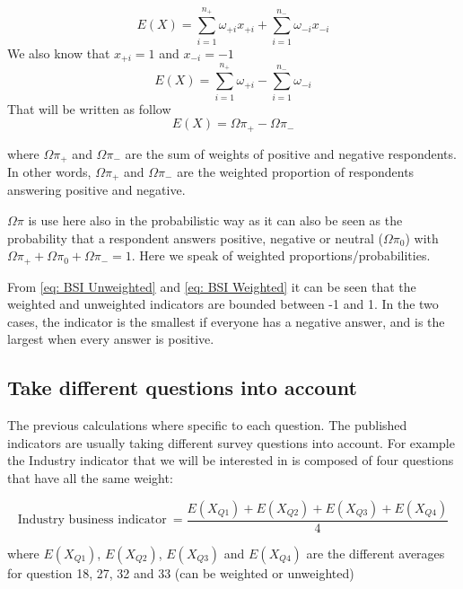\documentclass[12pt,a4paper,oneside]{book}
\begin{document}
\begin{equation}
    E(X) = \sum_{i=1}^{n_+} \omega_{+i} x_{+i} + \sum_{i=1}^{n_-} \omega_{-i} x_{-i}
\end{equation} 
We also know that $x_{+i} = 1$  and $x_{-i}=-1$  
\begin{equation}
    E(X) = \sum_{i=1}^{n_+} \omega_{+i}  - \sum_{i=1}^{n_-} \omega_{-i}
\end{equation}
That will be written as follow
\begin{equation}
    E(X) = \Omega \pi_+ - \Omega \pi_- \label{eq: BSI Weighted}
\end{equation}

where $\Omega \pi_+$ and $\Omega \pi_-$ are the sum of weights of positive and negative respondents. 
In other words, $\Omega \pi_+$ and $\Omega \pi_-$ are the weighted proportion of respondents answering positive and negative. 

$\Omega \pi$ is use here also in the probabilistic way as it can also be seen as the probability that a respondent answers positive, negative or neutral ($\Omega \pi_0$) with $\Omega \pi_+ + \Omega \pi_0 + \Omega \pi_- =1$. Here we speak of weighted proportions/probabilities.

From \autoref{eq: BSI Unweighted} and \autoref{eq: BSI Weighted} it can be seen that the weighted and unweighted indicators are bounded between -1 and 1. In the two cases, the indicator is the smallest if everyone has a negative answer, and is the largest when every answer is positive.

\subsection{Take different questions into account}

The previous calculations where specific to each question. The published indicators are usually taking different survey questions into account. For example the Industry indicator that we will be interested in is composed of four questions that have all the same weight:

\begin{equation}
    \mbox{Industry business indicator}\ = \frac{E(X_{Q1}) + E(X_{Q2}) + E(X_{Q3}) + E(X_{Q4})}{4}
\end{equation}

where 
$E(X_{Q1})$, $E(X_{Q2})$, $E(X_{Q3})$ and $E(X_{Q4})$ are the different averages for question 18, 27, 32 and 33 (can be weighted or unweighted)
\end{document}
